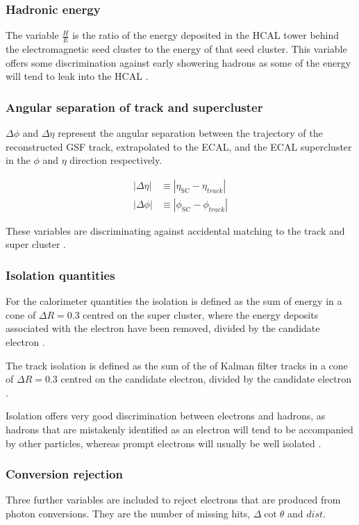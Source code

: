 \subsubsection{Hadronic energy}
The variable $\frac{H}{E}$ is the ratio of the energy deposited in the HCAL
tower behind the electromagnetic seed cluster to the energy of that seed
cluster. This variable offers some discrimination against early showering
hadrons as some of the energy will tend to leak into the HCAL
\cite{baffioni2009identification}.

\subsubsection{Angular separation of track and supercluster}
$\Delta\phi$ and $\Delta\eta$ represent the angular separation between the
trajectory of the reconstructed {GSF} track, extrapolated to the ECAL, and
the ECAL supercluster in the $\phi$ and $\eta$ direction respectively.

\begin{align}
|\Delta\eta| &\equiv |\eta_{\text{SC}} - \eta_{track}|\\
|\Delta\phi| &\equiv |\phi_{\text{SC}} - \phi_{track}|
\end{align}

These variables are discriminating against accidental matching to the track and
super cluster \cite{baffioni2009identification}.

\subsubsection{Isolation quantities}
For the calorimeter quantities the isolation is defined as the sum of energy in
a cone of $\Delta R = 0.3 $ centred on the super
cluster, where the energy deposits associated with the electron have been
removed, divided by the candidate electron \Pt.

The track isolation is defined as the sum of the \Pt of Kalman filter tracks in
a cone of $\Delta R = 0.3 $ centred on the candidate electron, divided by the
candidate electron \Pt.

Isolation offers very good discrimination between electrons and hadrons, as
hadrons that are mistakenly identified as an electron will tend to be
accompanied by other particles, whereas prompt electrons will usually be well
isolated \cite{baffioni2009identification,nikos}.

\subsubsection{Conversion rejection}
Three further variables are included to reject electrons that are produced from
photon conversions. They are the number of missing hits, $\Delta\cot\theta$ and
$dist$. 

